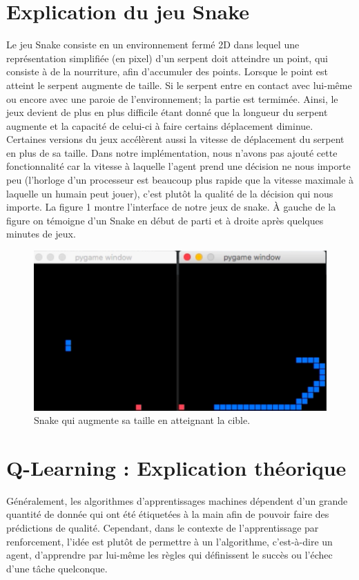 \documentclass{article}
\begin{document}
\section{Explication du jeu Snake }
Le jeu Snake consiste en un environnement fermé 2D dans lequel une représentation simplifiée (en pixel) d'un serpent doit atteindre un point, qui consiste à de la nourriture, afin d'accumuler des points. Lorsque le point est atteint le serpent augmente de taille. Si le serpent entre en contact avec lui-même ou encore avec une paroie de l'environnement; la partie est termimée. Ainsi, le jeux devient de plus en plus difficile étant donné que la longueur du serpent augmente et la capacité de celui-ci à faire certains déplacement diminue. Certaines versions du jeux accélèrent aussi la vitesse de déplacement du serpent en plus de sa taille. Dans notre implémentation, nous n'avons pas ajouté cette fonctionnalité car la vitesse à laquelle l'agent prend une décision ne nous importe peu (l'horloge d'un processeur est beaucoup plus rapide que la vitesse maximale à laquelle un humain peut jouer), c'est plutôt la qualité de la décision qui nous importe. La figure 1 montre l'interface de notre jeux de snake. À gauche de la figure on témoigne d'un Snake en début de parti et à droite après quelques minutes de jeux. 
\begin{figure}[ht]
\includegraphics[width=\linewidth]{snake.png}
\caption{Snake qui augmente sa taille en atteignant la cible.}
\label{fig:Snake}
\end{figure}

\section{Q-Learning : Explication théorique  }
Généralement, les algorithmes d’apprentissages machines dépendent d’un grande quantité de donnée qui ont été étiquetées à la main afin de pouvoir faire des prédictions de qualité. Cependant, dans le contexte de l'apprentissage par renforcement, l’idée est plutôt de permettre à un l’algorithme, c’est-à-dire un agent, d’apprendre par lui-même les règles qui définissent le succès ou l’échec d’une tâche quelconque.\linebreak
\end{document}
